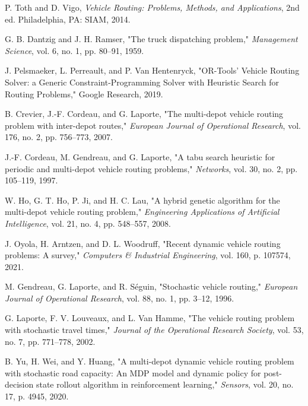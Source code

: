 \documentclass[conference]{IEEEtran} %
\begin{document}

\begin{thebibliography}{99}

P. Toth and D. Vigo, \textit{Vehicle Routing: Problems, Methods, and Applications}, 2nd ed. Philadelphia, PA: SIAM, 2014.

G. B. Dantzig and J. H. Ramser, "The truck dispatching problem," \textit{Management Science}, vol. 6, no. 1, pp. 80--91, 1959.

J. Pelsmaeker, L. Perreault, and P. Van Hentenryck, "OR-Tools’ Vehicle Routing Solver: a Generic Constraint-Programming Solver with Heuristic Search for Routing Problems," Google Research, 2019.

B. Crevier, J.-F. Cordeau, and G. Laporte, "The multi-depot vehicle routing problem with inter-depot routes," \textit{European Journal of Operational Research}, vol. 176, no. 2, pp. 756--773, 2007.

J.-F. Cordeau, M. Gendreau, and G. Laporte, "A tabu search heuristic for periodic and multi-depot vehicle routing problems," \textit{Networks}, vol. 30, no. 2, pp. 105--119, 1997.

W. Ho, G. T. Ho, P. Ji, and H. C. Lau, "A hybrid genetic algorithm for the multi-depot vehicle routing problem," \textit{Engineering Applications of Artificial Intelligence}, vol. 21, no. 4, pp. 548--557, 2008.

J. Oyola, H. Arntzen, and D. L. Woodruff, "Recent dynamic vehicle routing problems: A survey," \textit{Computers \& Industrial Engineering}, vol. 160, p. 107574, 2021.

M. Gendreau, G. Laporte, and R. Séguin, "Stochastic vehicle routing," \textit{European Journal of Operational Research}, vol. 88, no. 1, pp. 3--12, 1996.

G. Laporte, F. V. Louveaux, and L. Van Hamme, "The vehicle routing problem with stochastic travel times," \textit{Journal of the Operational Research Society}, vol. 53, no. 7, pp. 771--778, 2002.

B. Yu, H. Wei, and Y. Huang, "A multi-depot dynamic vehicle routing problem with stochastic road capacity: An MDP model and dynamic policy for post-decision state rollout algorithm in reinforcement learning," \textit{Sensors}, vol. 20, no. 17, p. 4945, 2020.


\end{thebibliography}
\end{document}
